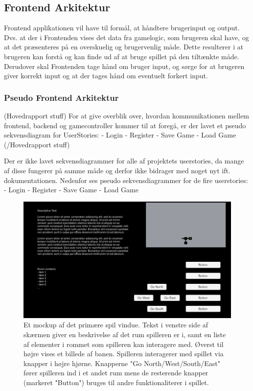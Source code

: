 \subsection{Frontend Arkitektur}

Frontend applikationen vil have til formål, at håndtere brugerinput og output. Dvs. at der i Frontenden vises det data fra gamelogic, som brugeren skal have, og at det præsenteres på en overskuelig og brugervenlig måde. Dette resulterer i at brugeren kan forstå og kan finde ud af at bruge spillet på den tiltænkte måde.
Derudover skal Frontenden tage hånd om bruger input, og sørge for at brugeren giver korrekt input og at der tages hånd om eventuelt forkert input.

\subsubsection{Pseudo Frontend Arkitektur}
(Hovedrapport stuff)
For at give overblik over, hvordan kommunikationen mellem frontend, backend og gamecontroller kommer til at foregå, er der lavet et pseudo sekvensdiagram for UserStories:
- Login
- Register
- Save Game
- Load Game
(/Hovedrapport stuff)

Der er ikke lavet sekvensdiagrammer for alle af projektets userstories, da mange af disse fungerer på samme måde og derfor ikke bidrager med noget nyt ift. dokumentationen.
Nedenfor ses pseudo sekvensdiagrammer for de fire userstories:
- Login
- Register
- Save Game
- Load Game

\begin{figure}[h]
\centering
\includegraphics[width = \textwidth]{02-Body/Images/RoomMockup.PNG}
\caption{Et mockup af det primære spil vindue. Tekst i venstre side af skærmen giver en beskrivelse af det rum spilleren er i, samt en liste af elementer i rommet som spilleren kan interagere med. Øverst til højre vises et billede af banen. Spilleren interagerer med spillet via knapper i højre hjørne. Knapperne "Go {North/West/South/East}" fører spilleren ind i et andet rum mens de resterende knapper (markeret "Button") bruges til andre funktionaliterer i spillet.}
\label{fig:Design-FE-mockup-room}
\end{figure}


